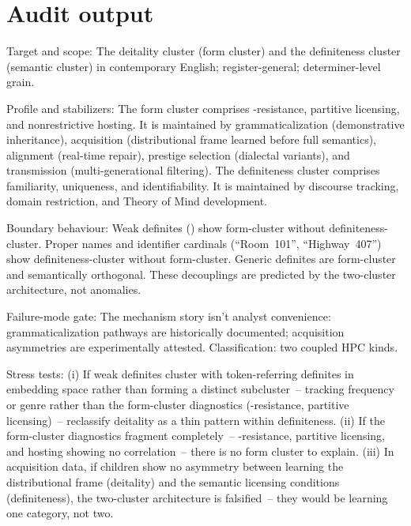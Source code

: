 \section{Audit output}
\label{sec:10:audit}

Target and scope: The deitality cluster (form cluster) and the definiteness cluster (semantic cluster) in contemporary English; register-general; determiner-level grain.

Profile and stabilizers: The form cluster comprises -resistance, partitive licensing, and nonrestrictive hosting. It is maintained by grammaticalization (demonstrative inheritance), acquisition (distributional frame learned before full semantics), alignment (real-time repair), prestige selection (dialectal variants), and transmission (multi-generational filtering). The definiteness cluster comprises familiarity, uniqueness, and identifiability. It is maintained by discourse tracking, domain restriction, and Theory of Mind development.

Boundary behaviour: Weak definites () show form-cluster without definiteness-cluster. Proper names and identifier cardinals (\enquote{Room~101}, \enquote{Highway~407}) show definiteness-cluster without form-cluster. Generic definites are form-cluster and semantically orthogonal. These decouplings are predicted by the two-cluster architecture, not anomalies.

Failure-mode gate: The mechanism story isn't analyst convenience: grammaticalization pathways are historically documented; acquisition asymmetries are experimentally attested. Classification: two coupled HPC kinds.

Stress tests: (i) If weak definites cluster with token-referring definites in embedding space rather than forming a distinct subcluster~-- tracking frequency or genre rather than the form-cluster diagnostics (-resistance, partitive licensing)~-- reclassify deitality as a thin pattern within definiteness. (ii) If the form-cluster diagnostics fragment completely~-- -resistance, partitive licensing, and hosting showing no correlation~-- there is no form cluster to explain. (iii) In acquisition data, if children show no asymmetry between learning the distributional frame (deitality) and the semantic licensing conditions (definiteness), the two-cluster architecture is falsified~-- they would be learning one category, not two.

